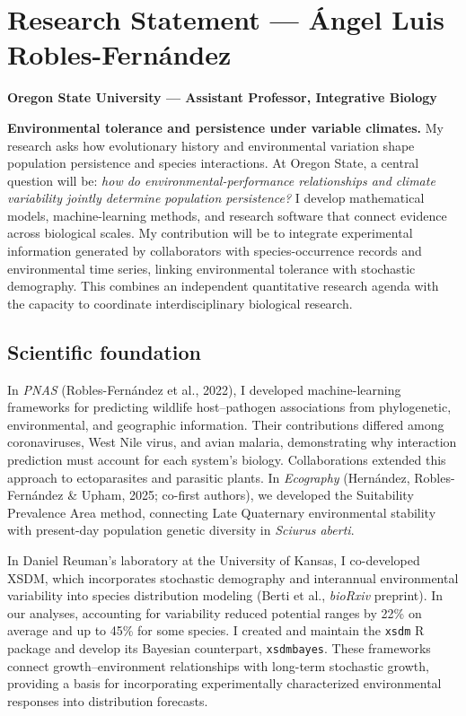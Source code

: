 \documentclass[11pt,letterpaper]{article}
\begin{document}
\section*{Research Statement --- \'{A}ngel Luis Robles-Fern\'andez}
\textbf{Oregon State University --- Assistant Professor, Integrative Biology}

\textbf{Environmental tolerance and persistence under variable climates.}
My research asks how evolutionary history and environmental variation shape population persistence and species interactions. At Oregon State, a central question will be: \emph{how do environmental-performance relationships and climate variability jointly determine population persistence?} I develop mathematical models, machine-learning methods, and research software that connect evidence across biological scales. My contribution will be to integrate experimental information generated by collaborators with species-occurrence records and environmental time series, linking environmental tolerance with stochastic demography. This combines an independent quantitative research agenda with the capacity to coordinate interdisciplinary biological research.

\subsection*{Scientific foundation}
In \emph{PNAS} (Robles-Fern\'andez et al., 2022), I developed machine-learning frameworks for predicting wildlife host--pathogen associations from phylogenetic, environmental, and geographic information. Their contributions differed among coronaviruses, West Nile virus, and avian malaria, demonstrating why interaction prediction must account for each system's biology. Collaborations extended this approach to ectoparasites and parasitic plants. In \emph{Ecography} (Hern\'andez, Robles-Fern\'andez \& Upham, 2025; co-first authors), we developed the Suitability Prevalence Area method, connecting Late Quaternary environmental stability with present-day population genetic diversity in \emph{Sciurus aberti}.

In Daniel Reuman's laboratory at the University of Kansas, I co-developed XSDM, which incorporates stochastic demography and interannual environmental variability into species distribution modeling (Berti et al., \emph{bioRxiv} preprint). In our analyses, accounting for variability reduced potential ranges by 22\% on average and up to 45\% for some species. I created and maintain the \texttt{xsdm} R package and develop its Bayesian counterpart, \texttt{xsdmbayes}. These frameworks connect growth--environment relationships with long-term stochastic growth, providing a basis for incorporating experimentally characterized environmental responses into distribution forecasts.
\end{document}

